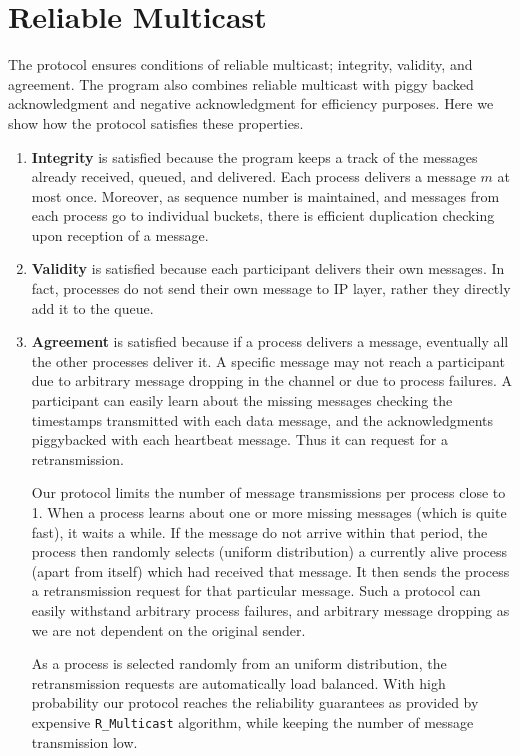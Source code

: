 \documentclass[11pt]{report}
\begin{document}
	\section{Reliable Multicast}
		The protocol ensures conditions of reliable multicast; integrity, validity, and agreement.  The program also combines reliable multicast with piggy backed acknowledgment and negative acknowledgment for efficiency purposes. Here we show how the protocol satisfies these properties.
		\begin{enumerate}
			\item \textbf{Integrity} is satisfied because the program keeps a track of the messages already received, queued, and delivered. Each process delivers a message $m$ at most once. Moreover, as sequence number is maintained, and messages from each process go to individual buckets, there is efficient duplication checking upon reception of a message.
			\item \textbf{Validity} is satisfied because each participant delivers their own messages. In fact, processes do not send their own message to IP layer, rather they directly add it to the queue.

			\item \textbf{Agreement} is satisfied because if a process delivers a message, eventually all the other processes deliver it. A specific message may not reach a participant due to arbitrary message dropping in the channel or due to process failures. A participant can easily learn about the missing messages checking the timestamps transmitted with each data message, and the acknowledgments piggybacked with each heartbeat message. Thus it can request for a retransmission.

Our protocol limits the number of message transmissions per process close to 1. When a process learns about one or more missing messages (which is quite fast), it waits a while. If the message do not arrive within that period, the process then randomly selects (uniform distribution) a currently alive process (apart from itself) which had received that message. It then sends the process a retransmission request for that particular message. Such a protocol can easily withstand arbitrary process failures, and arbitrary message dropping as we are not dependent on the original sender. 

As a process is selected randomly from an uniform distribution, the retransmission requests are automatically load balanced. With high probability our protocol reaches the reliability guarantees as provided by expensive \verb+R_Multicast+ algorithm, while keeping the number of message transmission low.
			
		\end{enumerate}
	
\end{document}
